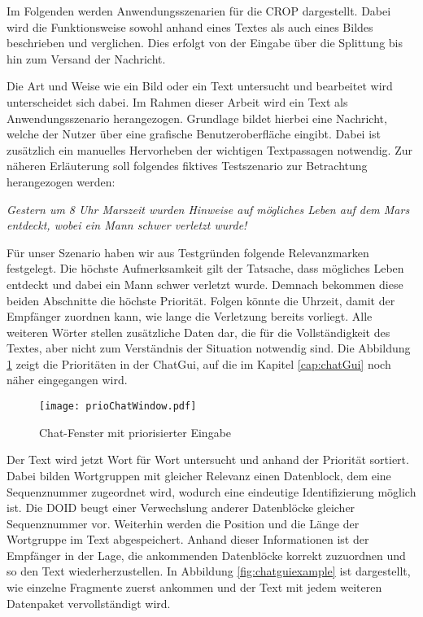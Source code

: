 \label{sec:Anwendungsszenarien}

Im Folgenden werden Anwendungsszenarien für die \gls{CROP} dargestellt. Dabei
wird die Funktionsweise sowohl anhand eines Textes als auch eines Bildes beschrieben und
verglichen. Dies erfolgt von der Eingabe über die Splittung bis hin zum Versand
der Nachricht.

Die Art und Weise wie ein Bild oder ein Text untersucht und bearbeitet wird
unterscheidet sich dabei. Im Rahmen dieser Arbeit wird ein Text als
Anwendungsszenario herangezogen. Grundlage bildet hierbei eine Nachricht,
welche der Nutzer über eine grafische Benutzeroberfläche eingibt.
Dabei ist zusätzlich ein manuelles Hervorheben der wichtigen Textpassagen
notwendig. Zur näheren Erläuterung soll folgendes fiktives Testszenario zur
Betrachtung herangezogen werden:

\textit{\glqq Gestern um 8 Uhr Marszeit wurden Hinweise auf mögliches Leben auf
dem Mars entdeckt, wobei ein Mann schwer verletzt wurde! \grqq}

Für unser Szenario haben wir aus Testgründen folgende Relevanzmarken
festgelegt. Die höchste Aufmerksamkeit gilt der Tatsache, dass mögliches Leben
entdeckt und dabei ein Mann schwer verletzt wurde. Demnach bekommen diese beiden
Abschnitte die höchste Priorität. Folgen könnte die Uhrzeit, damit der Empfänger
zuordnen kann, wie lange die Verletzung bereits vorliegt. Alle weiteren Wörter
stellen zusätzliche Daten dar, die für die Vollständigkeit des Textes, aber
nicht zum Verständnis der Situation notwendig sind. Die Abbildung
\ref{fig:prioChatWindow} zeigt die Prioritäten in der ChatGui, auf die im
Kapitel \ref{cap:chatGui} noch näher eingegangen wird.

\begin{figure}[H]
	\centering
	\texttt{[image: prioChatWindow.pdf]}
	\caption{Chat-Fenster mit priorisierter Eingabe}
	\label{fig:prioChatWindow}
\end{figure}

Der Text wird jetzt Wort für Wort untersucht und anhand der Priorität sortiert.
Dabei bilden Wortgruppen mit gleicher Relevanz einen Datenblock, dem eine
Sequenznummer zugeordnet wird, wodurch eine eindeutige Identifizierung möglich
ist. Die \gls{DOID} beugt einer Verwechslung anderer Datenblöcke gleicher
Sequenznummer vor. Weiterhin werden die Position und die Länge der Wortgruppe im
Text abgespeichert. Anhand dieser Informationen ist der Empfänger in der Lage,
die ankommenden Datenblöcke korrekt zuzuordnen und so den Text
wiederherzustellen.
In Abbildung \ref{fig:chatguiexample} ist dargestellt, wie einzelne Fragmente
zuerst ankommen und der Text mit jedem weiteren Datenpaket vervollständigt wird.

